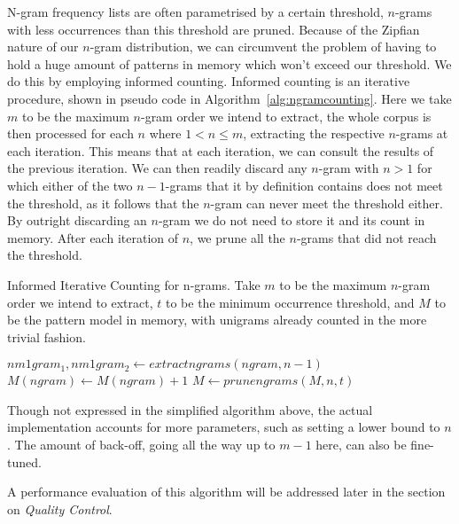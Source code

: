 \documentclass[a4paper,12pt]{article}
\begin{document}
N-gram frequency lists are often parametrised by a certain threshold, $n$-grams
with less occurrences than this threshold are pruned. Because of the Zipfian
nature of our $n$-gram distribution, we can circumvent the problem of having to
hold a huge amount of patterns in memory which won't exceed our threshold. We do this by
employing informed counting. Informed counting is an iterative procedure, shown
in pseudo code in Algorithm~\ref{alg:ngramcounting}. Here we take $m$ to be the maximum
$n$-gram order we intend to extract, the whole corpus is then processed for
each $n$ where $1<n\leq m$, extracting the respective $n$-grams at each
iteration. This means that at each iteration, we can consult the results of the
previous iteration. We can then readily discard any $n$-gram with $n>1$ for
which either of the two $n-1$-grams that it by definition contains does not
meet the threshold, as it follows that the $n$-gram can never meet the
threshold either. By outright discarding an $n$-gram we do not need to store it
and its count in memory. After each iteration of $n$, we prune all the
$n$-grams that did not reach the threshold.


\begin{algorithm} \caption{Informed Iterative Counting for n-grams.  Take $m$
to be the maximum $n$-gram order we intend to extract, $t$ to be the minimum occurrence threshold, and $M$ to be the
pattern model in memory, with unigrams already counted in the more trivial fashion.}
\label{alg:ngramcounting}
\begin{algorithmic}
            \State  $nm1gram_1, nm1gram_2 \leftarrow extractngrams(ngram,n-1)$
                \State $M(ngram) \leftarrow M(ngram) + 1$
            \EndIf
        \EndFor 
    \EndFor
    \State $M \leftarrow prunengrams(M,n,t)$
\EndFor \\
\end{algorithmic}
\end{algorithm}

Though not expressed in the simplified algorithm above, the actual
implementation accounts for more parameters, such as setting a lower bound to
$n$. The amount of back-off, going all the way up to $m-1$ here, can also be
fine-tuned.

A performance evaluation of this algorithm will be addressed later in the
section on \emph{Quality Control}.
\end{document}
